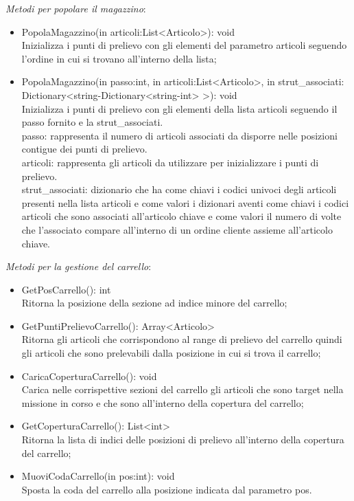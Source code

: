 \textit{Metodi per popolare il magazzino}:
\begin{itemize}
    \item PopolaMagazzino(in articoli:List<Articolo>): void\\
    Inizializza i punti di prelievo con gli elementi del parametro articoli seguendo l'ordine in cui si trovano all'interno della lista;
    \item PopolaMagazzino(in passo:int, in articoli:List<Articolo>, in strut\_associati: Dictionary<string-Dictionary<string-int> >): void\\
    Inizializza i punti di prelievo con gli elementi della lista articoli seguendo il passo fornito e la strut\_associati.\\
    passo: rappresenta il numero di articoli associati da disporre nelle posizioni contigue dei punti di prelievo.\\
    articoli: rappresenta gli articoli da utilizzare per inizializzare i punti di prelievo.\\
    strut\_associati: dizionario che ha come chiavi i codici univoci degli articoli presenti nella lista articoli e come valori i dizionari aventi come chiavi 
    i codici articoli che sono associati all'articolo chiave e come valori il numero di volte che l'associato compare all'interno di un ordine cliente assieme all'articolo chiave.\\
\end{itemize}
\textit{Metodi per la gestione del carrello}:
\begin{itemize}
    \item GetPosCarrello(): int\\
    Ritorna la posizione della sezione ad indice minore del carrello;
    \item GetPuntiPrelievoCarrello(): Array<Articolo>\\
    Ritorna gli articoli che corrispondono al range di prelievo del carrello quindi gli articoli che sono prelevabili dalla posizione in cui si trova il carrello;
    \item CaricaCoperturaCarrello(): void\\
    Carica nelle corrispettive sezioni del carrello gli articoli che sono target nella missione in corso e che sono all'interno della copertura del carrello;
    \item GetCoperturaCarrello(): List<int>\\
    Ritorna la lista di indici delle posizioni di prelievo all'interno della copertura del carrello;
    \item MuoviCodaCarrello(in pos:int): void\\
    Sposta la coda del carrello alla posizione indicata dal parametro pos.\\
\end{itemize}
